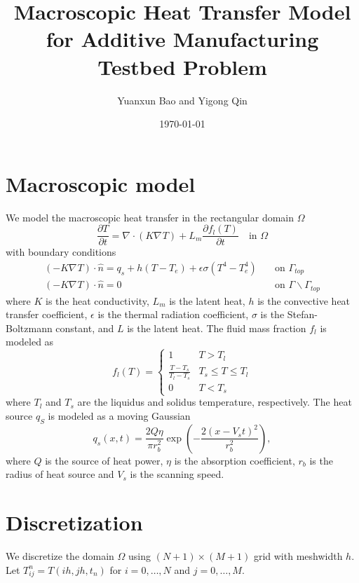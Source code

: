 \documentclass[a4paper,12pt]{article}
\title{Macroscopic Heat Transfer Model for Additive Manufacturing Testbed Problem}
\author{Yuanxun Bao and Yigong Qin}
\date{\today}
\renewcommand{\div}[1]{\nabla_{#1} \cdot}
\newcommand{\grad}[1]{\nabla_{#1}}
\begin{document}
\maketitle


\section{Macroscopic model}

We model the macroscopic heat transfer in the rectangular domain $\Omega$
\begin{equation}
\frac{\partial T}{ \partial t} = \div{} ( K \grad{} T) + L_m \frac{\partial f_l(T)}{\partial t} \quad \text{in }  \Omega
\end{equation}
with boundary conditions 
\begin{align}
(-K \grad{} T) \cdot \hat{n} = q_s + h(T - T_e) + \epsilon \sigma (T^4 - T_e^4)  & \quad \text{on } \Gamma_{top} \\
(-K \grad{} T) \cdot \hat{n} = 0  & \quad \text{on } \Gamma  \backslash \Gamma_{top}
\end{align}
where $K$ is the heat conductivity, $L_m$ is the latent heat, $h$ is the convective heat transfer coefficient, $\epsilon$ is the thermal radiation coefficient, $\sigma$ is the Stefan-Boltzmann constant, and $L$ is the latent heat. The fluid mass fraction $f_l$ is modeled as
\begin{equation}
f_l(T) =
\left\{
\begin{array}{cc}
1 & T>T_l \\
\frac{T-T_s}{T_l - T_s} & T_s \leq T \leq T_l \\
0 & T < T_s
\end{array}
\right.
\end{equation}
where $T_l$ and $T_s$ are the liquidus and solidus temperature, respectively.
The heat source $q_S$ is modeled as a moving Gaussian
\begin{equation}
q_s(x, t ) = \frac{2Q\eta}{\pi r_b^2} \exp \left( -\frac{ 2(x-V_s t)^2}{ r_b^2} \right),
\end{equation}
where $Q$ is the source of heat power, $\eta$ is the absorption coefficient, $r_b$ is the radius of heat source and $V_s$ is the scanning speed.  

\section{Discretization}
We discretize the domain $\Omega$ using $(N + 1) \times (M+1)$ grid with meshwidth $h$. Let $T_{ij}^n=T(ih, jh, t_n )$ for $i=0,\dots,N$ and $j = 0, \dots, M$.
\end{document}
